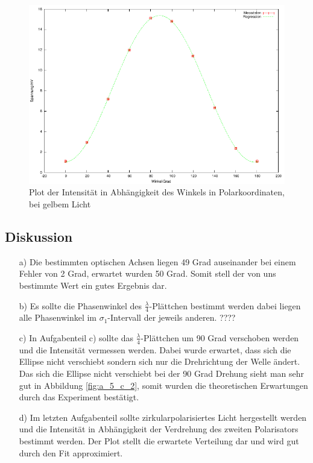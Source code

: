 \documentclass[12pt]{scrartcl}
\begin{document}
\begin{enumerate}
\begin{figure}[H]
\centering
    \includegraphics[scale = 1]{a_5_d.pdf}
  	\caption[Plot der Intensität in Abhängigkeit des Winkels in Polarkoordinaten, bei gelbem Licht]{Plot der Intensität in Abhängigkeit des Winkels in Polarkoordinaten, bei gelbem Licht}
  \label{fig:a_5_d}
\end{figure}
\end{enumerate}
\subsection{Diskussion}
\begin{enumerate}
\item[a)] Die bestimmten optischen Achsen liegen 49 Grad auseinander bei einem Fehler von 2 Grad, erwartet wurden 50 Grad. Somit stell der von uns bestimmte Wert ein gutes Ergebnis dar.

\item[b)] Es sollte die Phasenwinkel des $\frac{\lambda}{4}$-Plättchen bestimmt werden dabei liegen alle Phasenwinkel im $\sigma_1$-Intervall der jeweils anderen. ????

\item[c)] In Aufgabenteil c) sollte das $\frac{\lambda}{4}$-Plättchen um 90 Grad verschoben werden und die Intensität vermessen werden. Dabei wurde erwartet, dass sich die Ellipse nicht verschiebt sondern sich nur die Drehrichtung der Welle ändert. Das sich die Ellipse nicht verschiebt bei der 90 Grad Drehung sieht man sehr gut in Abbildung \ref{fig:a_5_c_2}, somit wurden die theoretischen Erwartungen durch das Experiment bestätigt.

\item[d)] Im letzten Aufgabenteil sollte zirkularpolarisiertes Licht hergestellt werden und die Intensität in Abhängigkeit der Verdrehung des zweiten Polarisators bestimmt werden. Der Plot stellt die erwartete Verteilung dar und wird gut durch den Fit approximiert.
 
\end{enumerate}
\end{document}
